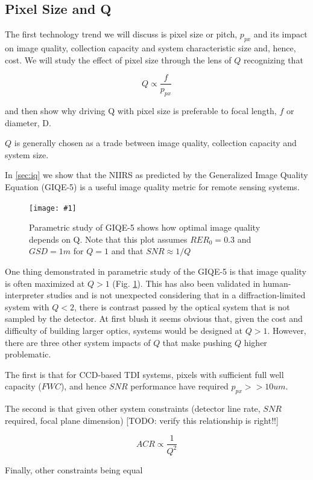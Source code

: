 \documentclass[10pt,journal]{IEEEtran}  %
\newcommand{\includefigure}[3]
{
  \begin{figure}[h!]
  \centering
  \texttt{[image: \#1]}
  \caption[]{#3}
  \label{#2}
  \end{figure}
}
\begin{document}
\subsection{Pixel Size and Q}

The first technology trend we will discuss is pixel size or pitch, $p_{px}$ and its impact on image quality, collection capacity and system characteristic size and, hence, cost.  We will study the effect of pixel size through the lens of $Q$ recognizing that

$$Q \propto \frac{f}{p_{px}}$$

and then show why driving Q with pixel size is preferable to focal length, $f$ or diameter, D.

$Q$ is generally chosen as a trade between image quality, collection capacity and system size.  

In \ref{sec:iq} we show that the NIIRS as predicted by the Generalized Image Quality Equation (GIQE-5) is a useful image quality metric for remote sensing systems.

\includefigure{figures/Q_iq.pgf}{fig:q_iq}{Parametric study of GIQE-5 shows how optimal image quality depends on Q.  Note that this plot assumes $RER_0 = 0.3$ and $GSD = 1m$ for $Q=1$ and that $SNR \approx 1 / Q$}

One thing demonstrated in parametric study of the GIQE-5 is that image quality is often maximized at $Q>1$ (Fig. \ref{fig:q_iq}).  This has also been validated in human-interpreter studies \cite{fiete_Q_IQ} and is not unexpected considering that in a diffraction-limited system with $Q<2$, there is contrast passed by the optical system that is not sampled by the detector.  At first blush it seems obvious that, given the cost and difficulty of building larger optics, systems would be designed at $Q>1$.  However, there are three other system impacts of $Q$ that make pushing $Q$ higher problematic.

The first is that for CCD-based TDI systems, pixels with sufficient full well capacity ($FWC$), and hence $SNR$ performance have required $p_{px} >> 10um$.

The second is that given other system constraints (detector line rate, $SNR$ required, focal plane dimension) [TODO: verify this relationship is right!!]

\begin{equation}
    ACR \propto \frac{1}{Q^2}
\end{equation}

Finally, other constraints being equal
\end{document}
